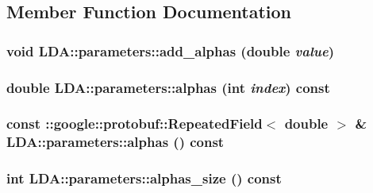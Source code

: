 \subsection{Member Function Documentation}
\hypertarget{class_l_d_a_1_1parameters_acc255b8e5e148ae8f39c3f3a0ecf4e40}{
\subsubsection[{add\_\-alphas}]{\setlength{\rightskip}{0pt plus 5cm}void LDA::parameters::add\_\-alphas (double {\em value})}}
\label{class_l_d_a_1_1parameters_acc255b8e5e148ae8f39c3f3a0ecf4e40}
\hypertarget{class_l_d_a_1_1parameters_aaac9dfc262ea17a6e4b83ebf9488f055}{
\subsubsection[{alphas}]{\setlength{\rightskip}{0pt plus 5cm}double LDA::parameters::alphas (int {\em index}) const}}
\label{class_l_d_a_1_1parameters_aaac9dfc262ea17a6e4b83ebf9488f055}
\hypertarget{class_l_d_a_1_1parameters_a6a52f0323ff62c46382a4ca50985f9ba}{
\subsubsection[{alphas}]{\setlength{\rightskip}{0pt plus 5cm}const ::google::protobuf::RepeatedField$<$ double $>$ \& LDA::parameters::alphas () const}}
\label{class_l_d_a_1_1parameters_a6a52f0323ff62c46382a4ca50985f9ba}
\hypertarget{class_l_d_a_1_1parameters_ae423748d74bfdf74e56d1b8cc65058f9}{
\subsubsection[{alphas\_\-size}]{\setlength{\rightskip}{0pt plus 5cm}int LDA::parameters::alphas\_\-size () const}}

